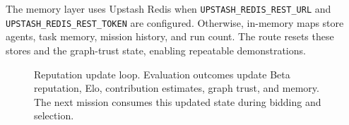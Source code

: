 The memory layer uses Upstash Redis when \texttt{UPSTASH\_REDIS\_REST\_URL} and \texttt{UPSTASH\_REDIS\_REST\_TOKEN} are configured. Otherwise, in-memory maps store agents, task memory, mission history, and run count. The route  resets these stores and the graph-trust state, enabling repeatable demonstrations.

\begin{figure}[t]
\centering
{}
\caption{Reputation update loop. Evaluation outcomes update Beta reputation, Elo, contribution estimates, graph trust, and memory. The next mission consumes this updated state during bidding and selection.}
\label{fig:reputation-loop}
\end{figure}
